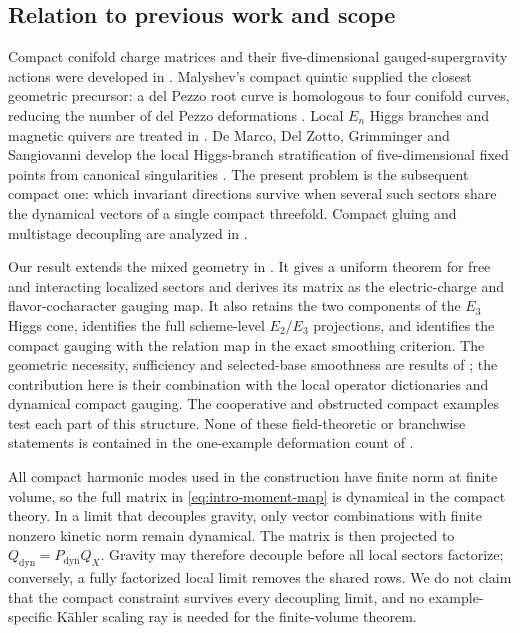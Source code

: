 \subsection*{Relation to previous work and scope}

Compact conifold charge matrices and their five-dimensional
gauged-supergravity actions were developed in \cite{Mohaupt:2004de}.
Malyshev's compact quintic supplied the closest geometric precursor: a del
Pezzo root curve is homologous to four conifold curves, reducing the number of
del Pezzo deformations \cite{Malyshev:2007zz}. Local $E_n$ Higgs branches and
magnetic quivers are treated in
\cite{Cremonesi:2015lsa,Ferlito:2016,Cabrera:2018,Bourget:2020bxh,Closset:2020afy}.
De Marco, Del Zotto, Grimminger and Sangiovanni develop the local Higgs-branch
stratification of five-dimensional fixed points from canonical singularities
\cite{DeMarco:2026higgs}. The present problem is the subsequent compact one:
which invariant directions survive when several such sectors share the
dynamical vectors of a single compact threefold. Compact gluing and multistage
decoupling are analyzed in
\cite{Apruzzi:2019vpe,Cvetic:2023plv}.

Our result extends the mixed geometry in
\cite{Malyshev:2007zz}. It gives a uniform theorem for free and interacting
localized sectors and derives its matrix as the electric-charge and
flavor-cocharacter gauging map. It also retains the two components of the
$E_3$ Higgs cone, identifies the full scheme-level $E_2/E_3$ projections, and
identifies the compact gauging with the relation map in the exact smoothing
criterion. The geometric necessity, sufficiency and selected-base
smoothness are results of \cite{Wuebben:2026smoothing}; the contribution here
is their combination with the local operator dictionaries and dynamical
compact gauging.
The cooperative and obstructed compact examples test each part of this
structure. None of these field-theoretic or branchwise statements is contained
in the one-example deformation count of \cite{Malyshev:2007zz}.

All compact harmonic modes used in the construction have finite norm at
finite volume, so the full matrix in \eqref{eq:intro-moment-map} is dynamical
in the compact theory. In a limit that decouples gravity, only vector
combinations with finite nonzero kinetic norm remain dynamical. The matrix is
then projected to $Q_{\mathrm{dyn}}=P_{\mathrm{dyn}}Q_X$. Gravity may therefore
decouple before all local sectors factorize; conversely, a fully factorized
local limit removes the shared rows. We do not claim that the compact
constraint survives every decoupling limit, and no example-specific K\"ahler
scaling ray is needed for the finite-volume theorem.

